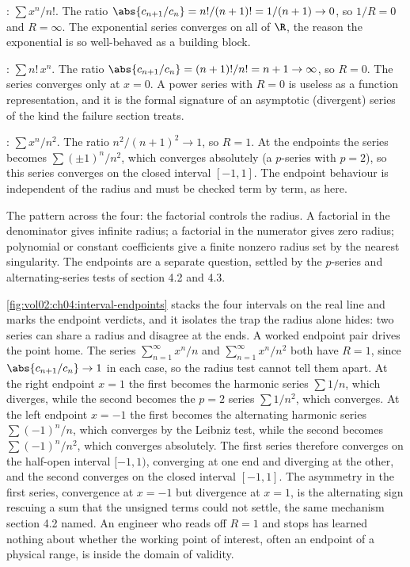 : $\sum x^{n}/n!$. The ratio
$\abs{c_{n+1}/c_{n}} = n!/(n+1)! = 1/(n+1) \to 0$, so $1/R = 0$ and
$R = \infty$. The exponential series converges on all of $\R$, the
reason the exponential is so well-behaved as a building block.

: $\sum n! \, x^{n}$. The ratio
$\abs{c_{n+1}/c_{n}} = (n+1)!/n! = n+1 \to \infty$, so $R = 0$. The
series converges only at $x = 0$. A power series with $R = 0$ is useless
as a function representation, and it is the formal signature of an
asymptotic (divergent) series of the kind the failure section treats.

: $\sum x^{n}/n^{2}$. The ratio
$n^{2}/(n+1)^{2} \to 1$, so $R = 1$. At the endpoints the series
becomes $\sum (\pm 1)^{n}/n^{2}$, which converges absolutely (a
$p$-series with $p = 2$), so this series converges on the closed
interval $[-1, 1]$. The endpoint behaviour is independent of the
radius and must be checked term by term, as here.

The pattern across the four: the factorial controls the radius. A
factorial in the denominator gives infinite radius; a factorial in the
numerator gives zero radius; polynomial or constant coefficients give a
finite nonzero radius set by the nearest singularity. The endpoints are
a separate question, settled by the $p$-series and alternating-series
tests of section 4.2 and 4.3.



\autoref{fig:vol02:ch04:interval-endpoints} stacks the four intervals on
the real line and marks the endpoint verdicts, and it isolates the trap
the radius alone hides: two series can share a radius and disagree at the
ends. A worked endpoint pair drives the point home. The series
$\sum_{n=1}^{\infty} x^{n}/n$ and $\sum_{n=1}^{\infty} x^{n}/n^{2}$ both
have $R = 1$, since $\abs{c_{n+1}/c_{n}} \to 1$ in each case, so the
radius test cannot tell them apart. At the right endpoint $x = 1$ the
first becomes the harmonic series $\sum 1/n$, which diverges, while the
second becomes the $p = 2$ series $\sum 1/n^{2}$, which converges. At the
left endpoint $x = -1$ the first becomes the alternating harmonic series
$\sum (-1)^{n}/n$, which converges by the Leibniz test, while the second
becomes $\sum (-1)^{n}/n^{2}$, which converges absolutely. The first
series therefore converges on the half-open interval $[-1, 1)$, converging
at one end and diverging at the other, and the second converges on the
closed interval $[-1, 1]$. The asymmetry in the first series, convergence
at $x = -1$ but divergence at $x = 1$, is the alternating sign rescuing a
sum that the unsigned terms could not settle, the same mechanism section
4.2 named. An engineer who reads off $R = 1$ and stops has learned nothing
about whether the working point of interest, often an endpoint of a
physical range, is inside the domain of validity.

